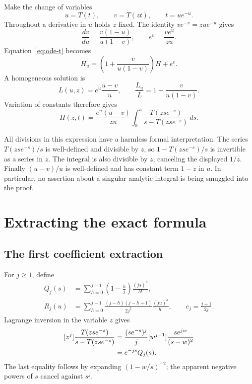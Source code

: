 \documentclass[11pt,letterpaper]{article}
\numberwithin{equation}{section}
\theoremstyle{definition}
\begin{document}
Make the change of variables
\[
 u=T(t),\qquad v=T(zt),\qquad t=u e^{-u}.
\]
Throughout a derivative in $u$ holds $z$ fixed. The identity
$v e^{-v}=z u e^{-u}$ gives
\begin{equation}\label{eq:vderivative}
 \frac{dv}{du}=\frac{v(1-u)}{u(1-v)},
 \qquad e^v=\frac{v e^u}{zu}.
\end{equation}
Equation~\eqref{eq:ode-t} becomes
\begin{equation}\label{eq:ode-u}
 H_u=\left(1+\frac{v}{u(1-v)}\right)H+e^v.
\end{equation}
A homogeneous solution is
\[
 L(u,z)=e^u\frac{u-v}{u},
 \qquad
 \frac{L_u}{L}=1+\frac{v}{u(1-v)}.
\]
Variation of constants therefore gives
\begin{equation}\label{eq:H-integral}
 H(z,t)=\frac{e^u(u-v)}{zu}
 \int_0^u\frac{T(zs e^{-s})}{s-T(zs e^{-s})}\,ds.
\end{equation}

All divisions in this expression have a harmless formal interpretation.
The series $T(zs e^{-s})/s$ is well-defined and divisible by $z$, so
$1-T(zs e^{-s})/s$ is invertible as a series in $z$. The integral is also
divisible by $z$, canceling the displayed $1/z$. Finally $(u-v)/u$ is
well-defined and has constant term $1-z$ in $u$. In particular, no assertion
about a singular analytic integral is being smuggled into the proof.

\section{Extracting the exact formula}
\label{sec:extraction}

\subsection{The first coefficient extraction}
For $j\ge1$, define
\begin{align}
 Q_j(s)&=\sum_{h=0}^{j-1}\left(1-\frac hj\right)\frac{(js)^h}{h!},
 \label{eq:Q}\\
 R_j(u)&=\sum_{h=0}^{j-1}
 \frac{(j-h)(j-h+1)}{2j^2}\frac{(ju)^h}{h!},
 \qquad c_j=\frac{j+1}{2j}.
 \label{eq:R}
\end{align}
Lagrange inversion in the variable $z$ gives
\begin{align}\label{eq:integrand-coefficient}
 [z^j]\frac{T(zs e^{-s})}{s-T(zs e^{-s})}
 &=\frac{(s e^{-s})^j}{j}
       [w^{j-1}]\frac{s e^{jw}}{(s-w)^2} \notag\\
 &=e^{-js}Q_j(s).
\end{align}
The last equality follows by expanding $(1-w/s)^{-2}$; the apparent negative
powers of $s$ cancel against $s^j$.
\end{document}
